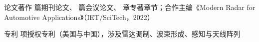 %
%
%


\begin{cvskills}

    \cvskill
        {论文著作}
        {\cvJournals{} 篇期刊论文、\cvConfPapers{} 篇会议论文、\cvChapters{} 章专著章节；合作主编《Modern Radar for Automotive Applications》（IET/SciTech，2022）}

    \cvskill
        {专利}
        {\cvPatents{} 项授权专利（美国与中国），涉及雷达调制、波束形成、感知与天线阵列}

\end{cvskills}
